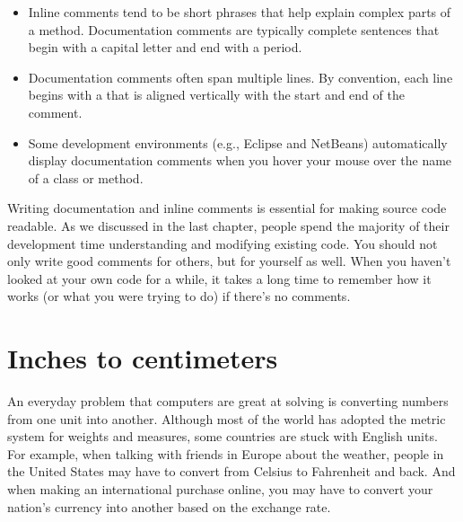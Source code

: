 \begin{itemize}
\item Inline comments tend to be short phrases that help explain complex parts of a method.
Documentation comments are typically complete sentences that begin with a capital letter and end with a period.

\item Documentation comments often span multiple lines.
By convention, each line begins with a {\tt *} that is aligned vertically with the start and end of the comment.

\item Some development environments (e.g., Eclipse and NetBeans) automatically display documentation comments when you hover your mouse over the name of a class or method.

\end{itemize}

Writing documentation and inline comments is essential for making source code readable.
As we discussed in the last chapter, people spend the majority of their development time understanding and modifying existing code.
You should not only write good comments for others, but for yourself as well.
When you haven't looked at your own code for a while, it takes a long time to remember how it works (or what you were trying to do) if there's no comments.


\section{Inches to centimeters}

An everyday problem that computers are great at solving is converting numbers from one unit into another.
Although most of the world has adopted the metric system for weights and measures, some countries are stuck with English units.
For example, when talking with friends in Europe about the weather, people in the United States may have to convert from Celsius to Fahrenheit and back.
And when making an international purchase online, you may have to convert your nation's currency into another based on the exchange rate.


